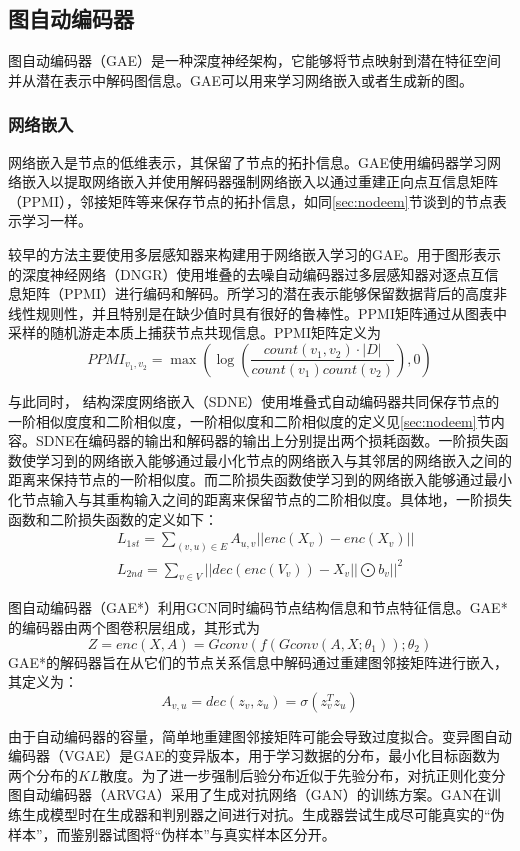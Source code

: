 \subsection{图自动编码器}
图自动编码器（GAE）是一种深度神经架构，它能够将节点映射到潜在特征空间并从潜在表示中解码图信息。GAE可以用来学习网络嵌入或者生成新的图。

\subsubsection{网络嵌入}
网络嵌入是节点的低维表示，其保留了节点的拓扑信息。GAE使用编码器学习网络嵌入以提取网络嵌入并使用解码器强制网络嵌入以通过重建正向点互信息矩阵（PPMI），邻接矩阵等来保存节点的拓扑信息，如同\ref{sec:nodeem}节谈到的节点表示学习一样。

较早的方法主要使用多层感知器来构建用于网络嵌入学习的GAE。用于图形表示的深度神经网络（DNGR）\cite{cao2016deep}使用堆叠的去噪自动编码器过多层感知器对逐点互信息矩阵（PPMI）进行编码和解码。所学习的潜在表示能够保留数据背后的高度非线性规则性，并且特别是在缺少值时具有很好的鲁棒性。PPMI矩阵通过从图表中采样的随机游走本质上捕获节点共现信息。PPMI矩阵定义为
\[PPMI_{v_1, v_2} = \max(\log (\frac{count(v_1, v_2)\cdot |D|}{count(v_1)count(v_2)}), 0)\]

与此同时， 结构深度网络嵌入（SDNE）\cite{wang2016structural}使用堆叠式自动编码器共同保存节点的一阶相似度度和二阶相似度，一阶相似度和二阶相似度的定义见\ref{sec:nodeem}节内容。SDNE在编码器的输出和解码器的输出上分别提出两个损耗函数。一阶损失函数使学习到的网络嵌入能够通过最小化节点的网络嵌入与其邻居的网络嵌入之间的距离来保持节点的一阶相似度。而二阶损失函数使学习到的网络嵌入能够通过最小化节点输入与其重构输入之间的距离来保留节点的二阶相似度。具体地，一阶损失函数和二阶损失函数的定义如下：
\begin{align*}
  &L_{1st} = \sum_{(v, u) \in E}A_{u, v} ||enc(X_v) - enc(X_v)||\\
  & L_{2nd} = \sum_{v\in V} ||dec(enc(V_v)) - X_v||\bigodot b_v||^2
\end{align*}

图自动编码器（GAE*）\cite{61}利用GCN同时编码节点结构信息和节点特征信息。GAE*的编码器由两个图卷积层组成，其形式为
\[Z = enc(X, A) = Gconv (f(Gconv(A, X; \theta_1)); \theta_2)\]
GAE*的解码器旨在从它们的节点关系信息中解码通过重建图邻接矩阵进行嵌入，其定义为：
\[A_{v, u} = dec(z_v, z_u) = \sigma(z_v^Tz_u)\]

由于自动编码器的容量，简单地重建图邻接矩阵可能会导致过度拟合。变异图自动编码器（VGAE）\cite{kipf2016variational}是GAE的变异版本，用于学习数据的分布，最小化目标函数为两个分布的$KL$散度。为了进一步强制后验分布近似于先验分布，对抗正则化变分图自动编码器（ARVGA）\cite{pan2018adversarially}采用了生成对抗网络（GAN）的训练方案。GAN在训练生成模型时在生成器和判别器之间进行对抗。生成器尝试生成尽可能真实的“伪样本”，而鉴别器试图将“伪样本”与真实样本区分开。


